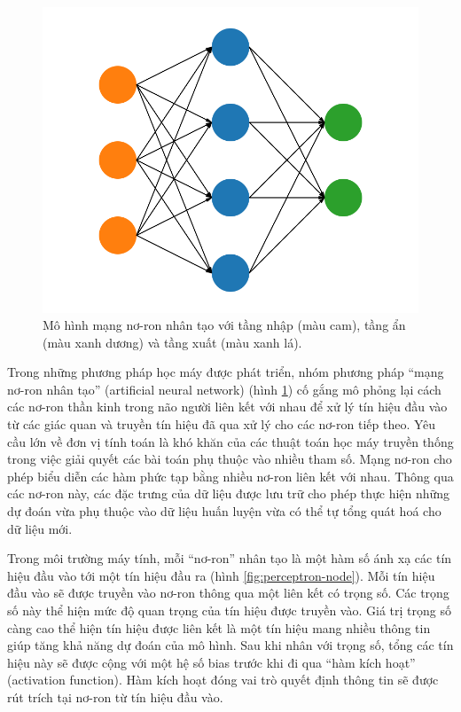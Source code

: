 \begin{figure}[htp]
	\centering
	\includegraphics[width=80 mm]{images/ann.png}
	\caption{Mô hình mạng nơ-ron nhân tạo với tầng nhập (màu cam), tầng ẩn (màu xanh dương) và tầng xuất (màu xanh lá).}
	\label{fig:ann}
\end{figure}

Trong những phương pháp học máy được phát triển, nhóm phương pháp ``mạng nơ-ron nhân tạo'' (artificial neural network) (hình \ref{fig:ann}) cố gắng mô phỏng lại cách các nơ-ron thần kinh trong não người liên kết với nhau để xử lý tín hiệu đầu vào từ các giác quan và truyền tín hiệu đã qua xử lý cho các nơ-ron tiếp theo. Yêu cầu lớn về đơn vị tính toán là khó khăn của các thuật toán học máy truyền thống trong việc giải quyết các bài toán phụ thuộc vào nhiều tham số. Mạng nơ-ron cho phép biểu diễn các hàm phức tạp bằng nhiều nơ-ron liên kết với nhau. Thông qua các nơ-ron này, các đặc trưng của dữ liệu được lưu trữ cho phép thực hiện những dự đoán vừa phụ thuộc vào dữ liệu huấn luyện vừa có thể tự tổng quát hoá cho dữ liệu mới.

Trong môi trường máy tính, mỗi ``nơ-ron'' nhân tạo là một hàm số ánh xạ các tín hiệu đầu vào tới một tín hiệu đầu ra (hình \ref{fig:perceptron-node}). Mỗi tín hiệu đầu vào sẽ được truyền vào nơ-ron thông qua một liên kết có trọng số. Các trọng số này thể hiện mức độ quan trọng của tín hiệu được truyền vào. Giá trị trọng số càng cao thể hiện tín hiệu được liên kết là một tín hiệu mang nhiều thông tin giúp tăng khả năng dự đoán của mô hình. Sau khi nhân với trọng số, tổng các tín hiệu này sẽ được cộng với một hệ số bias trước khi đi qua ``hàm kích hoạt'' (activation function). Hàm kích hoạt đóng vai trò quyết định thông tin sẽ được rút trích tại nơ-ron từ tín hiệu đầu vào.

